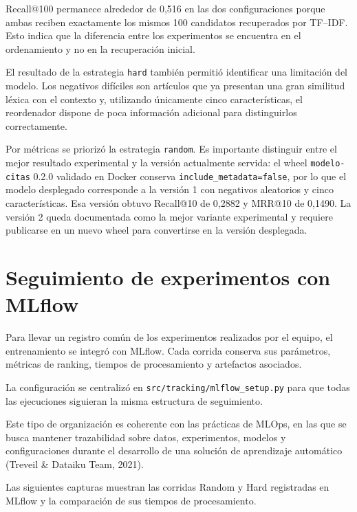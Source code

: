 \documentclass[9pt]{article}
\begin{document}
Recall@100 permanece alrededor de 0,516 en las dos configuraciones porque
ambas reciben exactamente los mismos 100 candidatos recuperados por TF--IDF.
Esto indica que la diferencia entre los experimentos se encuentra en el
ordenamiento y no en la recuperación inicial.

El resultado de la estrategia \texttt{hard} también permitió identificar una
limitación del modelo. Los negativos difíciles son artículos que ya presentan
una gran similitud léxica con el contexto y, utilizando únicamente cinco
características, el reordenador dispone de poca información adicional para
distinguirlos correctamente.

Por métricas se priorizó la estrategia \texttt{random}. Es importante
distinguir entre el mejor resultado experimental y la versión actualmente
servida: el wheel \texttt{modelo-citas} 0.2.0 validado en Docker conserva
\texttt{include\_metadata=false}, por lo que el modelo desplegado corresponde a
la versión 1 con negativos aleatorios y cinco características. Esa versión
obtuvo Recall@10 de 0,2882 y MRR@10 de 0,1490. La versión 2 queda documentada
como la mejor variante experimental y requiere publicarse en un nuevo wheel
para convertirse en la versión desplegada.


\section{Seguimiento de experimentos con MLflow}

Para llevar un registro común de los experimentos realizados por el equipo, el
entrenamiento se integró con MLflow. Cada corrida conserva sus parámetros,
métricas de ranking, tiempos de procesamiento y artefactos asociados.

La configuración se centralizó en
\texttt{src/tracking/mlflow\_setup.py} para que todas las ejecuciones siguieran
la misma estructura de seguimiento.

Este tipo de organización es coherente con las prácticas de MLOps, en las que
se busca mantener trazabilidad sobre datos, experimentos, modelos y
configuraciones durante el desarrollo de una solución de aprendizaje automático
(Treveil \& Dataiku Team, 2021).

Las siguientes capturas muestran las corridas Random y Hard registradas en
MLflow y la comparación de sus tiempos de procesamiento.
\end{document}

